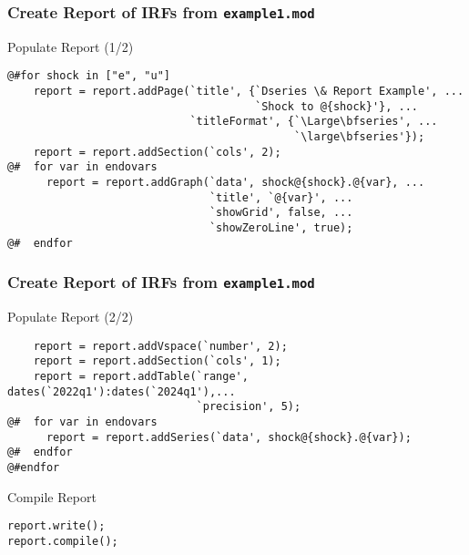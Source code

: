 \documentclass[10pt]{beamer}
\begin{document}
\begin{frame}[fragile=singleslide]
  \frametitle{Create Report of IRFs from \texttt{example1.mod}}
  \begin{block}{Populate Report (1/2)}
\small{
\begin{verbatim}
@#for shock in ["e", "u"]
    report = report.addPage(`title', {`Dseries \& Report Example', ...
                                      `Shock to @{shock}'}, ...
                            `titleFormat', {`\Large\bfseries', ...
                                            `\large\bfseries'});
    report = report.addSection(`cols', 2);
@#  for var in endovars
      report = report.addGraph(`data', shock@{shock}.@{var}, ...
                               `title', `@{var}', ...
                               `showGrid', false, ...
                               `showZeroLine', true);
@#  endfor
\end{verbatim}
}
  \end{block}
\end{frame}


\begin{frame}[fragile=singleslide]
  \frametitle{Create Report of IRFs from \texttt{example1.mod}}
  \begin{block}{Populate Report (2/2)}
\small{
\begin{verbatim}
    report = report.addVspace(`number', 2);
    report = report.addSection(`cols', 1);
    report = report.addTable(`range', dates(`2022q1'):dates(`2024q1'),...
                             `precision', 5);
@#  for var in endovars
      report = report.addSeries(`data', shock@{shock}.@{var});
@#  endfor
@#endfor
\end{verbatim}
}
  \end{block}

  \begin{block}{Compile Report}
\small{
\begin{verbatim}
report.write();
report.compile();
\end{verbatim}
}
  \end{block}
\end{frame}
\end{document}
